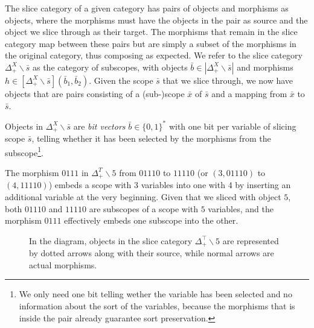 \documentclass[runningheads]{llncs}
\begin{document}
The slice category of a given category has pairs of objects and morphisms as objects, where the morphisms must have the objects in the pair as source and the object we slice through as their target. 
The morphisms that remain in the slice category map between these pairs but are simply a subset of the morphisms in the original category, thus composing as expected. 
We refer to the slice category $Δ_+^X∖\bar{s}$ as the category of subscopes, with objects $\bar{b} \in |Δ_+^X∖\bar{s}|$ and morphisms $h \in [Δ_+^X∖\bar{s}](\bar{b}_1, \bar{b}_2)$. 
Given the scope $\bar{s}$ that we slice through, we now have objects that are pairs consisting of a (sub-)scope $\bar{x}$ of $\bar{s}$ and a mapping from $\bar{x}$ to $\bar{s}$.

\begin{remark}
  Objects in $Δ_+^X∖\bar{s}$ are \emph{bit vectors} $\bar{b} ∈ \{0, 1\}^*$ with one bit per variable of slicing scope $\bar{s}$, telling whether it has been selected by the morphisms from the subscope\footnote{We only need one bit telling wether the variable has been selected and no information about the sort of the variables, because the morphisms that is inside the pair already guarantee sort preservation.}.
\end{remark}
\begin{example}
  The morphism $0111$ in $Δ_+^T∖5$ from $01110$ to $11110$ (or $(3, 01110)$ to $(4, 11110)$) embeds a scope with 3 variables into one with 4 by inserting an additional variable at the very beginning. 
  Given that we sliced with object $5$, both $01110$ and $11110$ are subscopes of a scope with $5$ variables, and the morphism $0111$ effectively embeds one subscope into the other.
  \begin{figure}[]
    \centering
    \caption{In the diagram, objects in the slice category $Δ_+^⊤∖5$ are represented by dotted arrows along with their source, while normal arrows are actual morphisms.}
    \label{fig:ex3}
  \end{figure}
\end{example}
\end{document}
